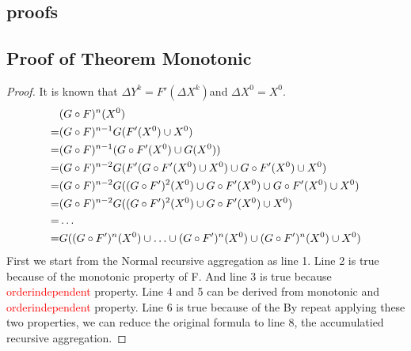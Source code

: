 \begin{appendix}
\section{proofs}
\subsection{Proof of Theorem Monotonic}

\begin{proof}
	\label{sec:app:proof:monotonic}
	It is known that $\Delta Y^k=F'(\Delta X^k)$and $\Delta X^0=X^0$.
	\begin{align}
	&(G\circ F)^n(X^0)\notag\\
	=&(G\circ F)^{n-1}G(F'(X^0)\cup X^0)\notag\\
	=&(G\circ F)^{n-1}(G\circ F'(X^0)\cup G(X^0))\notag\\
	=&(G\circ F)^{n-2}G(F'(G\circ F'(X^0)\cup X^0)\cup G\circ F'(X^0)\cup X^0)\notag\\
	=&(G\circ F)^{n-2}G((G\circ F')^2(X^0)\cup G\circ F'(X^0)\cup G\circ F'(X^0)\cup X^0)\notag\\
	=&(G\circ F)^{n-2}G((G\circ F')^2(X^0)\cup G\circ F'(X^0)\cup X^0)\notag\\
	=&\ldots\notag\\
	=&G((G\circ F')^{n}(X^0)\cup\ldots\cup (G\circ F')^{n}(X^0)\cup (G\circ F')^{n}(X^0)\cup X^0)\notag
	\end{align}
	First we start from the Normal recursive aggregation as line 1.	Line 2 is true because of the monotonic property of F. And line 3 is true because \textcolor{red}{orderindependent} property. Line 4 and 5 can be derived  from monotonic and \textcolor{red}{orderindependent} property. Line 6 is true because of the By repeat applying these two properties, we can reduce the original formula to line 8, the accumulatied recursive aggregation. 
\end{proof}


\end{appendix}
